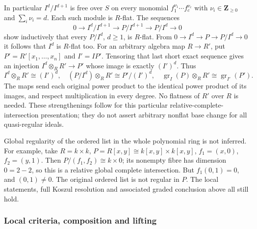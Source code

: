 In particular \(I^d/I^{d+1}\) is free over \(S\) on every monomial \(f_1^{\nu_1}\cdots f_c^{\nu_c}\) with \(\nu_i\in\mathbf Z_{\ge0}\) and \(\sum_i\nu_i=d\). Each such module is \(R\)-flat. The sequences \[
0\longrightarrow I^d/I^{d+1}\longrightarrow P/I^{d+1}\longrightarrow P/I^d\longrightarrow0
\] show inductively that every \(P/I^d\), \(d\ge1\), is \(R\)-flat. From \(0\to I^d\to P\to P/I^d\to0\) it follows that \(I^d\) is \(R\)-flat too. For an arbitrary algebra map \(R\to R'\), put \(P'=R'[x_1,\ldots,x_n]\) and \(I'=IP'\). Tensoring that last short exact sequence gives an injection \(I^d\otimes_R R'\to P'\) whose image is exactly \((I')^d\). Thus \[
I^d\otimes_R R'\cong(I')^d,\quad
(P/I^d)\otimes_R R'\cong P'/(I')^d,\quad
\operatorname{gr}_I(P)\otimes_R R'\cong\operatorname{gr}_{I'}(P').
\] The maps send each original power product to the identical power product of its images, and respect multiplication in every degree. No flatness of \(R'\) over \(R\) is needed. These strengthenings follow for this particular relative-complete-intersection presentation; they do not assert arbitrary nonflat base change for all quasi-regular ideals.

Global regularity of the ordered list in the whole polynomial ring is not inferred. For example, take \(R=k\times k\), \(P=R[x,y]\cong k[x,y]\times k[x,y]\), \(f_1=(x,0)\), \(f_2=(y,1)\). Then \(P/(f_1,f_2)\cong k\times0\); its nonempty fibre has dimension \(0=2-2\), so this is a relative global complete intersection. But \(f_1(0,1)=0\), and \((0,1)\ne0\). The original ordered list is not regular in \(P\). The local statements, full Koszul resolution and associated graded conclusion above all still hold.

\subsubsection{Local criteria, composition and lifting}\label{algebra-proof-046-local-criteria-composition-and-lifting}

